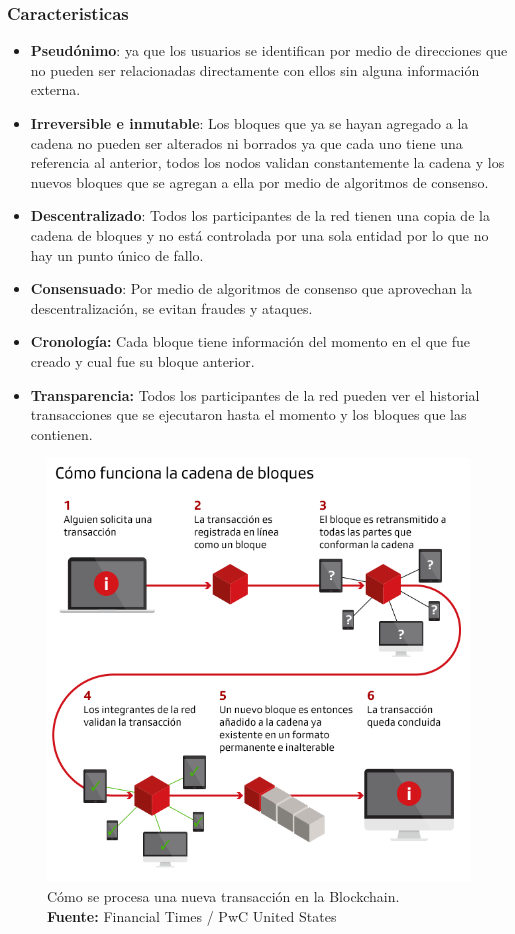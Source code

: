 \documentclass[
11pt, %
oneside, %
spanish, %
singlespacing, %
parskip, %
headsepline, %
chapterinoneline, %
]{MastersDoctoralThesis} %
\begin{document}
\subsubsection*{Caracteristicas}
\begin{itemize}
\item \textbf{Pseudónimo}: ya que los usuarios se identifican por medio de direcciones que no pueden ser relacionadas directamente con ellos sin alguna información externa.
\item \textbf{Irreversible e inmutable}: Los bloques que ya se hayan agregado a la cadena no pueden ser alterados ni borrados ya que cada uno tiene una referencia al anterior, todos los nodos validan constantemente la cadena y los nuevos bloques que se agregan a ella por medio de algoritmos de consenso.
\item \textbf{Descentralizado}: Todos los participantes de la red tienen una copia de la cadena de bloques y no está controlada por una sola entidad por lo que no hay un punto único de fallo.
\item \textbf{Consensuado}: Por medio de algoritmos de consenso que aprovechan la descentralización, se evitan fraudes y ataques.
\item \textbf{Cronología:} Cada bloque tiene información del momento en el que fue creado y cual fue su bloque anterior.
\item \textbf{Transparencia:} Todos los participantes de la red pueden ver el historial transacciones que se ejecutaron hasta el momento y los bloques que las contienen.
\end{itemize}

\begin{figure}[H]
  	\centering
	\includegraphics[scale=0.5]{imgs/blockchain-explained.png}
	\caption{Cómo se procesa una nueva transacción en la Blockchain. \\ \textbf{Fuente:} Financial Times / PwC United States}
	\label{fig:bc-exp}
\end{figure}
\end{document}
